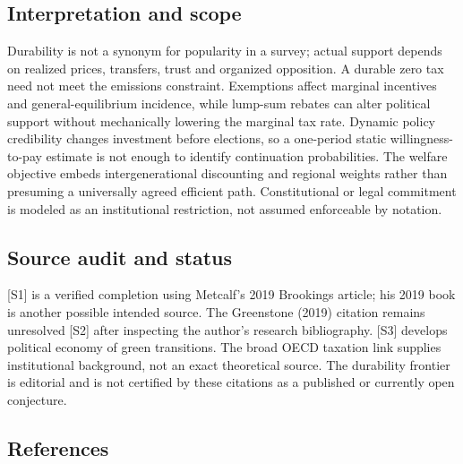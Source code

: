 \documentclass[11pt,a4paper]{article}
\begin{document}
\subsection*{Interpretation and scope}

Durability is not a synonym for popularity in a survey; actual support depends on realized prices, transfers, trust and organized opposition. A durable zero tax need not meet the emissions constraint. Exemptions affect marginal incentives and general-equilibrium incidence, while lump-sum rebates can alter political support without mechanically lowering the marginal tax rate. Dynamic policy credibility changes investment before elections, so a one-period static willingness-to-pay estimate is not enough to identify continuation probabilities. The welfare objective embeds intergenerational discounting and regional weights rather than presuming a universally agreed efficient path. Constitutional or legal commitment is modeled as an institutional restriction, not assumed enforceable by notation.

\subsection*{Source audit and status}

[S1] is a verified completion using Metcalf's 2019 Brookings article; his 2019 book is another possible intended source. The Greenstone (2019) citation remains unresolved [S2] after inspecting the author's research bibliography. [S3] develops political economy of green transitions. The broad OECD taxation link supplies institutional background, not an exact theoretical source. The durability frontier is editorial and is not certified by these citations as a published or currently open conjecture.

\subsection*{References}
\end{document}
